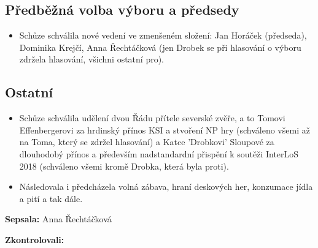 \documentclass[11pt,a4paper]{article}
\begin{document}
\subsection*{Předběžná volba výboru a předsedy}
\begin{itemize}[itemsep=0pt]
\item Schůze schválila nové vedení ve zmenšeném složení: Jan Horáček (předseda), Dominika Krejčí, Anna Řechtáčková (jen Drobek se při hlasování o výboru zdržela hlasování, všichni ostatní pro).
\end{itemize}

\subsection*{Ostatní}
\begin{itemize}[itemsep=0pt]
\item Schůze schválila udělení dvou Řádu přítele severské zvěře, a to Tomovi Effenbergerovi za hrdinský přínos KSI a stvoření NP hry (schváleno všemi až na Toma, který se zdržel hlasování) a Katce 'Drobkovi' Sloupové za dlouhodobý přínos a především nadstandardní přispění k soutěži InterLoS 2018 (schváleno všemi kromě Drobka, která byla proti).
\item Následovala i předcházela volná zábava, hraní deskových her, konzumace jídla a pití a tak dále.
\end{itemize}

\textbf{Sepsala:} Anna Řechtáčková

\textbf{Zkontrolovali:} 
\end{document}
